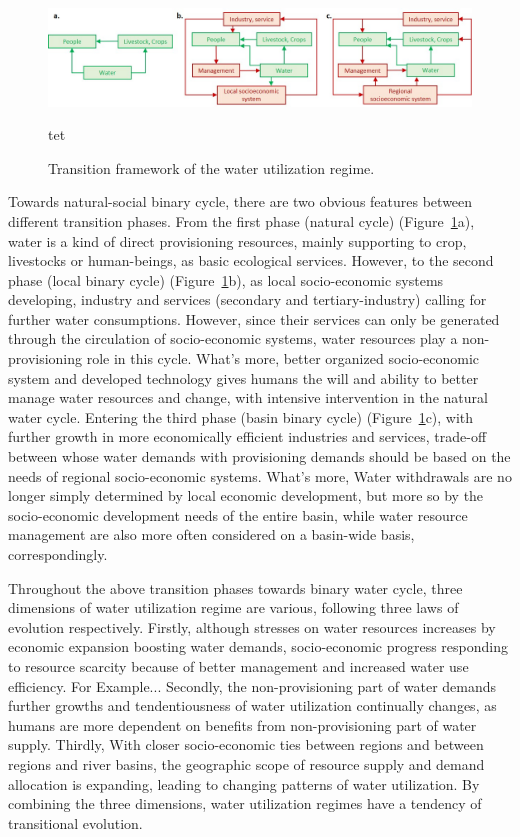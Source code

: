 \documentclass[9pt, twocolumn, twoside, lineno]{pnas-new}
\begin{document}
\begin{figure}%
	\centering
	\includegraphics[width=\linewidth]{../../figures/main_text/framework}
	\caption{Transition framework of the water utilization regime.}
	tet
	\label{fig:framework}
\end{figure}


Towards natural-social binary cycle, there are two obvious features between different transition phases.
From the first phase (natural cycle) (Figure~\ref{fig:framework}a), 
water is a kind of direct provisioning resources, mainly supporting to crop, livestocks or human-beings, 
as basic ecological services.
However, to the second phase (local binary cycle) (Figure~\ref{fig:framework}b), 
as local socio-economic systems developing, 
industry and services (secondary and tertiary-industry) calling for further water consumptions.
However, since their services can only be generated through the circulation of socio-economic systems, 
water resources play a non-provisioning role in this cycle. 
What's more, better organized socio-economic system and developed technology 
gives humans the will and ability to better manage water resources and change, 
with intensive intervention in the natural water cycle. 
Entering the third phase (basin binary cycle) (Figure~\ref{fig:framework}c), 
with further growth in more economically efficient industries and services, 
trade-off between whose water demands with provisioning demands 
should be based on the needs of regional socio-economic systems.
What's more, Water withdrawals are no longer simply determined by local economic development, 
but more so by the socio-economic development needs of the entire basin, 
while water resource management are also more often considered on a basin-wide basis, correspondingly. 


Throughout the above transition phases towards binary water cycle, 
three dimensions of water utilization regime are various, following three laws of evolution respectively.
Firstly, although stresses on water resources increases by economic expansion boosting water demands, 
socio-economic progress responding to resource scarcity because of better management and increased water use efficiency. 
For Example...
Secondly, the non-provisioning part of water demands further growths and 
tendentiousness of water utilization continually changes, 
as humans are more dependent on benefits from non-provisioning part of water supply.
Thirdly, With closer socio-economic ties between regions and between regions and river basins, 
the geographic scope of resource supply and demand allocation is expanding, 
leading to changing patterns of water utilization.
By combining the three dimensions, water utilization regimes have a tendency of transitional evolution.
\end{document}
